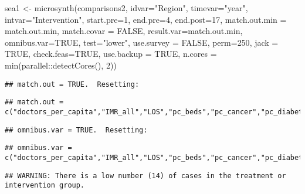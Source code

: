 \documentclass[
]{article}
\newenvironment{Shaded}{\begin{snugshade}}{\end{snugshade}}
\newcommand{\AttributeTok}[1]{\textcolor[rgb]{0.77,0.63,0.00}{#1}}
\newcommand{\ConstantTok}[1]{\textcolor[rgb]{0.00,0.00,0.00}{#1}}
\newcommand{\DecValTok}[1]{\textcolor[rgb]{0.00,0.00,0.81}{#1}}
\newcommand{\FunctionTok}[1]{\textcolor[rgb]{0.00,0.00,0.00}{#1}}
\newcommand{\NormalTok}[1]{#1}
\newcommand{\OtherTok}[1]{\textcolor[rgb]{0.56,0.35,0.01}{#1}}
\newcommand{\SpecialCharTok}[1]{\textcolor[rgb]{0.00,0.00,0.00}{#1}}
\newcommand{\StringTok}[1]{\textcolor[rgb]{0.31,0.60,0.02}{#1}}
\begin{document}
\begin{Shaded}
\begin{Highlighting}[]
\NormalTok{sea1 }\OtherTok{\textless{}{-}} \FunctionTok{microsynth}\NormalTok{(comparisons2, }\AttributeTok{idvar=}\StringTok{"Region"}\NormalTok{, }\AttributeTok{timevar=}\StringTok{"year"}\NormalTok{, }\AttributeTok{intvar=}\StringTok{"Intervention"}\NormalTok{,}
             \AttributeTok{start.pre=}\DecValTok{1}\NormalTok{, }\AttributeTok{end.pre=}\DecValTok{4}\NormalTok{, }\AttributeTok{end.post=}\DecValTok{17}\NormalTok{,}
             \AttributeTok{match.out.min =}\NormalTok{ match.out.min,}
             \AttributeTok{match.covar =} \ConstantTok{FALSE}\NormalTok{,}
             \AttributeTok{result.var=}\NormalTok{match.out.min, }\AttributeTok{omnibus.var=}\ConstantTok{TRUE}\NormalTok{,}
             \AttributeTok{test=}\StringTok{"lower"}\NormalTok{, }\AttributeTok{use.survey =} \ConstantTok{FALSE}\NormalTok{, }
             \AttributeTok{perm=}\DecValTok{250}\NormalTok{, }\AttributeTok{jack =} \ConstantTok{TRUE}\NormalTok{, }\AttributeTok{check.feas=}\ConstantTok{TRUE}\NormalTok{, }\AttributeTok{use.backup =} \ConstantTok{TRUE}\NormalTok{,}
             \AttributeTok{n.cores =} \FunctionTok{min}\NormalTok{(parallel}\SpecialCharTok{::}\FunctionTok{detectCores}\NormalTok{(), }\DecValTok{2}\NormalTok{))}
\end{Highlighting}
\end{Shaded}

\begin{verbatim}
## match.out = TRUE.  Resetting:
\end{verbatim}

\begin{verbatim}
## match.out = c("doctors_per_capita","IMR_all","LOS","pc_beds","pc_cancer","pc_diabetes","pc_digestive","pc_genitourinary","pc_injury","pc_TB","pc_hosp")
\end{verbatim}

\begin{verbatim}
## omnibus.var = TRUE.  Resetting:
\end{verbatim}

\begin{verbatim}
## omnibus.var = c("doctors_per_capita","IMR_all","LOS","pc_beds","pc_cancer","pc_diabetes","pc_digestive","pc_genitourinary","pc_injury","pc_TB","pc_hosp")
\end{verbatim}

\begin{verbatim}
## WARNING: There is a low number (14) of cases in the treatment or intervention group.
\end{verbatim}
\end{document}
